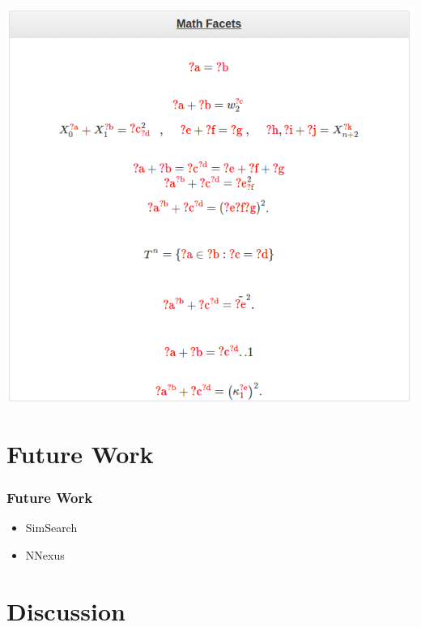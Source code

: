 \documentclass{beamer}
\begin{document}
\begin{center}
    \includegraphics[height=0.9\textheight]{img/temaV2_facets}
\end{center}
\section{Future Work}
\begin{frame}
\frametitle{Future Work}
\begin{itemize}
    \item SimSearch
    \item NNexus
\end{itemize}
\end{frame}

\section{Discussion}
\begin{frame}
\tableofcontents
\end{frame}
\end{document}
